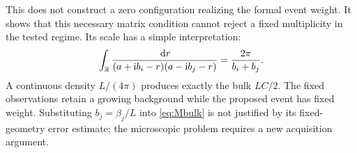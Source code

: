 This does not construct a zero configuration realizing the formal event
weight. It shows that this necessary matrix condition cannot reject a
fixed multiplicity in the tested regime. Its scale has a simple
interpretation:
\[
 \int_\mathbb R\frac{\,\mathrm d r}{(a+\mathrm i b_i-r)(a-\mathrm i b_j-r)}
       =\frac{2\pi}{b_i+b_j}.
\]
A continuous density \(L/(4\pi)\) produces exactly the bulk \(LC/2\).
The fixed observations retain a growing background while the proposed
event has fixed weight. Substituting \(b_j=\beta_j/L\) into
\eqref{eq:Mbulk} is not justified by its fixed-geometry error estimate;
the microscopic problem requires a new acquisition argument.
